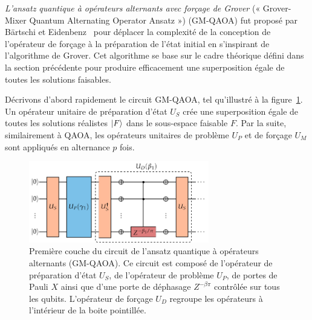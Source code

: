 \textit{L'ansatz quantique à opérateurs alternants avec forçage de Grover} (« Grover-Mixer Quantum Alternating Operator Ansatz ») (GM-QAOA) fut proposé par Bärtschi et Eidenbenz~\cite{bartschiGroverMixersQAOA2020} pour déplacer la complexité de la conception de l'opérateur de forçage à la préparation de l'état initial en s'inspirant de l'algorithme de Grover. Cet algorithme se base sur le cadre théorique défini dans la section précédente pour produire efficacement une superposition égale de toutes les solutions faisables.

Décrivons d'abord rapidement le circuit GM-QAOA, tel qu'illustré à la figure~\ref{fig:gm-qaoa}. Un opérateur unitaire de préparation d'état $U_{S}$ crée une superposition égale de toutes les solutions réalistes $\ket{F}$ dans le sous-espace faisable $F$. Par la suite, similairement à QAOA, les opérateurs unitaires de problème $U_{P}$ et de forçage $U_{M}$ sont appliqués en alternance $p$ fois.

\begin{figure}[ht!]
    \centering
    \includegraphics[width=0.7\textwidth]{figures/gm-qaoa}
    \caption[Circuit de l'ansatz quantique à opérateurs alternants avec forçage de Grover]{Première couche du circuit de l'ansatz quantique à opérateurs alternants (GM-QAOA). Ce circuit est composé de l'opérateur de préparation d'état $U_{S}$, de l'opérateur de problème $U_{P}$, de portes de Pauli $X$ ainsi que d'une porte de déphasage $Z^{-\beta \pi}$ contrôlée sur tous les qubits. L'opérateur de forçage $U_{D}$ regroupe les opérateurs à l'intérieur de la boite pointillée.}
    \label{fig:gm-qaoa}
\end{figure}

